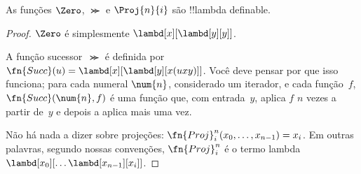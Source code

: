 \documentclass[../../../include/open-logic-section]{subfiles}
\begin{document}

\begin{lem}
As funções $\Zero$, $\Succ$ e $\Proj{n}{i}$ são !!{lambda definable}.
\end{lem}

\begin{proof}
$\Zero$ é simplesmente
$\lambd[x][\lambd[y][y]]$.

A função sucessor~$\Succ$ é definida por
$\fn{Succ}(u) = \lambd[x][\lambd[y][x(uxy)]]$. Você deve pensar por que isso
funciona; para cada numeral $\num{n}$, considerado um iterador, e cada
função~$f$, $\fn{Succ}(\num{n},f)$ é uma função que, com entrada~$y$, aplica
$f$ $n$ vezes a partir de~$y$ e depois a aplica mais uma vez.

Não há nada a dizer sobre projeções: $\fn{Proj}^n_i(x_0, \dots,
x_{n-1}) = x_i$. Em outras palavras, segundo nossas convenções,
$\fn{Proj}^n_i$ é o termo lambda
$\lambd[x_0][\dots \lambd[x_{n-1}][x_i]]$.
\end{proof}
\end{document}

